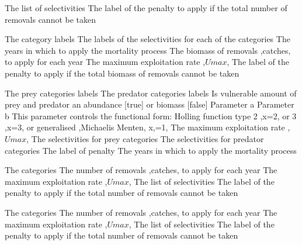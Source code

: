  {The list of selectivities}
 {The label of the penalty to apply if the total number of removals cannot be taken}
\par\textbf{}\par
{} {The category labels}
 {The labels of the selectivities for each of the categories}
 {The years in which to apply the mortality process}
 {The biomass of removals ,catches, to apply for each year}
 {The maximum exploitation rate ,$Umax$,}
 {The label of the penalty to apply if the total biomass of removals cannot be taken}
\par\textbf{}\par
{} {The prey categories labels}
 {The predator categories labels}
 {Is vulnerable amount of prey and predator an abundance [true] or biomass [false]}
 {Parameter a}
 {Parameter b}
 {This parameter controls the functional form: Holling function type 2 ,x=2, or 3 ,x=3, or generalised ,Michaelis Menten, x,=1,}
 {The maximum exploitation rate ,$Umax$,}
 {The selectivities for prey categories}
 {The selectivities for predator categories}
 {The label of penalty}
 {The years in which to apply the mortality process}
\par\textbf{}\par
{} {The categories}
 {The number of removals ,catches, to apply for each year}
 {The maximum exploitation rate ,$Umax$,}
 {The list of selectivities}
 {The label of the penalty to apply if the total number of removals cannot be taken}
\par\textbf{}\par
{} {The categories}
 {The number of removals ,catches, to apply for each year}
 {The maximum exploitation rate ,$Umax$,}
 {The list of selectivities}
 {The label of the penalty to apply if the total number of removals cannot be taken}
\par\textbf{}\par
